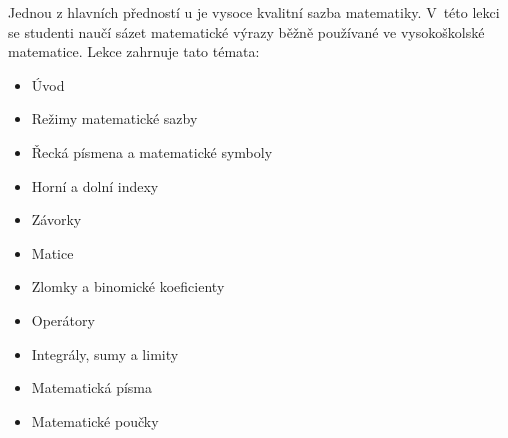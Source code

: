 {
	Jednou z hlavních předností u je vysoce kvalitní sazba matematiky. V~této lekci se studenti naučí sázet matematické výrazy běžně používané ve vysokoškolské matematice. Lekce zahrnuje tato témata:
	\begin{itemize}
		\item Úvod
		\item Režimy matematické sazby
		\item Řecká písmena a matematické symboly
		\item Horní a dolní indexy
		\item Závorky
		\item Matice
		\item Zlomky a binomické koeficienty
		\item Operátory
		\item Integrály, sumy a limity
		\item Matematická písma
		\item Matematické poučky
	\end{itemize}
}
\endinput
